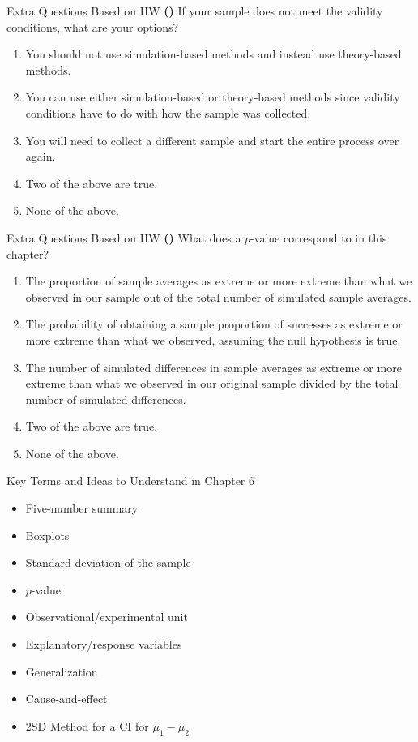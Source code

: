 \documentclass[13pt]{beamer}
\newcounter{count}
\newcommand{\question}{ \textbf{(\decimal{count})} \stepcounter{count}}
\newenvironment{click}{\begin{enumerate}[A]}{\end{enumerate}}
\begin{document}
\begin{frame}{Extra Questions Based on HW}
\question If your sample does not meet the validity conditions, what are your options?

\begin{click}
	\item You should not use simulation-based methods and instead use theory-based methods.
    \item You can use either simulation-based or theory-based methods since validity conditions have to do with how the sample was collected.
    \item You will need to collect a different sample and start the entire process over again.
    \item Two of the above are true.
    \item None of the above. %
\end{click}
\end{frame}

\begin{frame}{Extra Questions Based on HW}
\question What does a $p$-value correspond to in this chapter?

\begin{click}
	\item The proportion of sample averages as extreme or more extreme than what we observed in our sample out of the total number of simulated sample averages.
    \item The probability of obtaining a sample proportion of successes as extreme or more extreme than what we observed, assuming the null hypothesis is true.
    \item The number of simulated differences in sample averages as extreme or more extreme than what we observed in our original sample divided by the total number of simulated differences. %
    \item Two of the above are true.
    \item None of the above.
\end{click}
\end{frame}

\begin{frame}{Key Terms and Ideas to Understand in Chapter 6 }
\begin{itemize}
	\item Five-number summary
    \item Boxplots
	\item Standard deviation of the sample
	\item $p$-value
    \item Observational/experimental unit
    \item Explanatory/response variables
    \item Generalization
    \item Cause-and-effect
    \item 2SD Method for a CI for $\mu_1 - \mu_2$
\end{itemize}
\end{frame}
\end{document}
